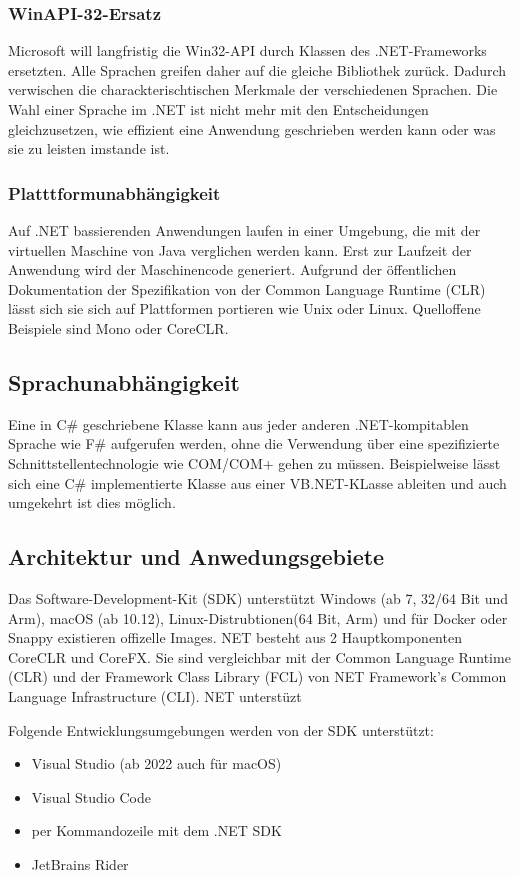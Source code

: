 \subsubsection{WinAPI-32-Ersatz}
Microsoft will langfristig die Win32-API durch Klassen des .NET-Frameworks ersetzten. Alle Sprachen greifen 
daher auf die gleiche Bibliothek zurück. Dadurch verwischen die charackterischtischen Merkmale der verschiedenen Sprachen. 
Die Wahl einer Sprache im .NET ist nicht mehr mit den Entscheidungen gleichzusetzen, wie effizient eine Anwendung geschrieben werden kann 
oder was sie zu leisten imstande ist.

\subsubsection{Platttformunabhängigkeit}
Auf .NET bassierenden Anwendungen laufen in einer Umgebung, die mit der virtuellen Maschine von Java verglichen werden kann.
Erst zur Laufzeit der Anwendung wird der Maschinencode generiert. Aufgrund der öffentlichen Dokumentation der Spezifikation von 
der Common Language Runtime (CLR) lässt sich sie sich auf Plattformen portieren wie Unix oder Linux. 
Quelloffene Beispiele sind Mono oder CoreCLR.

\subsection{Sprachunabhängigkeit}
Eine in C\# geschriebene Klasse kann aus jeder anderen .NET-kompitablen Sprache wie F\# aufgerufen werden, ohne die Verwendung über eine 
spezifizierte Schnittstellentechnologie wie COM/COM+ gehen zu müssen. Beispielweise lässt sich eine C\# implementierte Klasse aus einer 
VB.NET-KLasse ableiten und auch umgekehrt ist dies möglich.

\subsection{Architektur und Anwedungsgebiete}
Das Software-Development-Kit (SDK) unterstützt Windows (ab 7, 32/64 Bit und Arm), macOS (ab 10.12), Linux-Distrubtionen(64 Bit, Arm) 
und für Docker oder Snappy existieren offizelle Images. NET besteht aus 2 Hauptkomponenten CoreCLR und CoreFX. 
Sie sind vergleichbar mit der Common Language Runtime (CLR) und der  Framework Class Library (FCL) 
von NET Framework's Common Language Infrastructure (CLI). NET unterstüzt 

Folgende Entwicklungsumgebungen werden von der SDK unterstützt:
\begin{itemize}
    \item Visual Studio (ab 2022 auch für macOS)
    \item Visual Studio Code
    \item per Kommandozeile mit dem .NET SDK
    \item JetBrains Rider 
\end{itemize}

